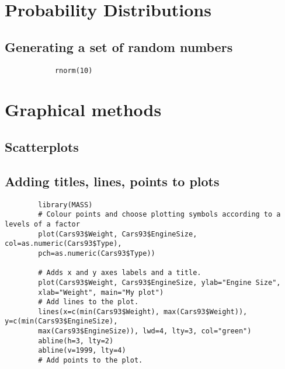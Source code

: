 \documentclass[a4paper,12pt]{article}
\begin{document}
\begin{itemize}
		
		
		
		\newpage
		\chapter{Probability Distributions}
		\section{Generating a set of random numbers}
		
		\begin{framed}
			\large \begin{verbatim}
			rnorm(10)
			\end{verbatim}\large
		\end{framed}
		
		
		\newpage
		\chapter{Graphical methods}
		
		\section{Scatterplots}
		
		
		\section{Adding titles, lines, points to plots}
		
		
		\large \begin{verbatim}
		library(MASS)
		# Colour points and choose plotting symbols according to a levels of a factor
		plot(Cars93$Weight, Cars93$EngineSize, col=as.numeric(Cars93$Type),
		pch=as.numeric(Cars93$Type))
		
		# Adds x and y axes labels and a title.
		plot(Cars93$Weight, Cars93$EngineSize, ylab="Engine Size",
		xlab="Weight", main="My plot")
		# Add lines to the plot.
		lines(x=c(min(Cars93$Weight), max(Cars93$Weight)), y=c(min(Cars93$EngineSize),
		max(Cars93$EngineSize)), lwd=4, lty=3, col="green")
		abline(h=3, lty=2)
		abline(v=1999, lty=4)
		# Add points to the plot.
		\end{verbatim}\large
		

\end{itemize}
\end{document}
